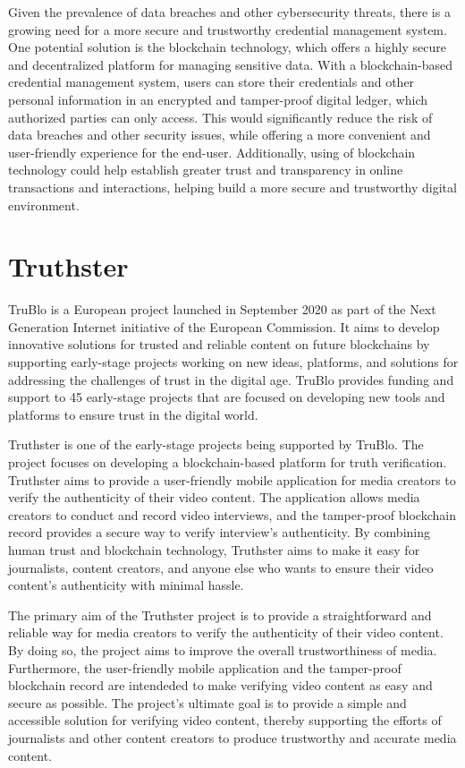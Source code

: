 \documentclass[target=mst,aauheader=]{thud}
\begin{document}
Given the prevalence of data breaches and other cybersecurity threats, there is a growing need for a more secure and trustworthy credential management system. One potential solution is the blockchain technology, which offers a highly secure and decentralized platform for managing sensitive data. With a blockchain-based credential management system, users can store their credentials and other personal information in an encrypted and tamper-proof digital ledger, which authorized parties can only access. This would significantly reduce the risk of data breaches and other security issues, while offering a more convenient and user-friendly experience for the end-user. Additionally, using of blockchain technology could help establish greater trust and transparency in online transactions and interactions, helping build a more secure and trustworthy digital environment.


\section{Truthster}

TruBlo is a European project launched in September 2020 as part of the Next Generation Internet initiative of the European Commission. It aims to develop innovative solutions for trusted and reliable content on future blockchains by supporting early-stage projects working on new ideas, platforms, and solutions for addressing the challenges of trust in the digital age. TruBlo provides funding and support to 45 early-stage projects \cite{trublo} that are focused on developing new tools and platforms to ensure trust in the digital world.

Truthster is one of the early-stage projects being supported by TruBlo. The project focuses on developing a blockchain-based platform for truth verification. Truthster aims to provide a user-friendly mobile application for media creators to verify the authenticity of their video content. The application allows media creators to conduct and record video interviews, and the tamper-proof blockchain record provides a secure way to verify interview's authenticity. By combining human trust and blockchain technology, Truthster aims to make it easy for journalists, content creators, and anyone else who wants to ensure their video content's authenticity with minimal hassle.

The primary aim of the Truthster project is to provide a straightforward and reliable way for media creators to verify the authenticity of their video content. By doing so, the project aims to improve the overall trustworthiness of media. Furthermore, the user-friendly mobile application and the tamper-proof blockchain record are intendeded to make verifying video content as easy and secure as possible. The project's ultimate goal is to provide a simple and accessible solution for verifying video content, thereby supporting the efforts of journalists and other content creators to produce trustworthy and accurate media content.
\end{document}
